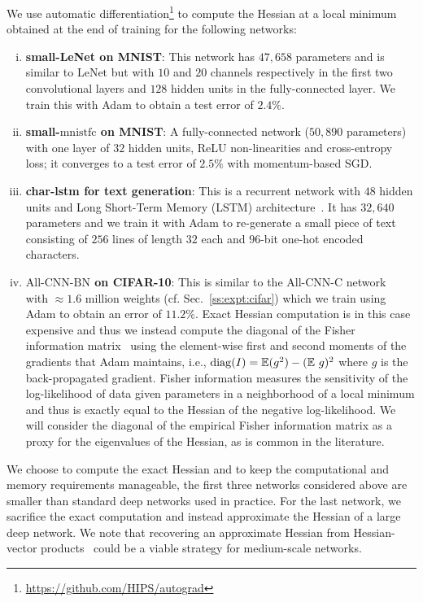 \documentclass[10pt]{article}
\newcommand{\mnistfc}{\textrm{mnistfc}}
\newcommand{\lenet}{\textrm{LeNet}}
\newcommand{\allcnn}{\textrm{All-CNN-BN}}
\begin{document}
We use automatic differentiation\footnote{\href{https://github.com/HIPS/autograd}{https://github.com/HIPS/autograd}} to compute the Hessian at a local minimum obtained at the end of training for the following networks:

\begin{enumerate}[(i)]
\item \textbf{small-LeNet on MNIST}: This network has $47,658$ parameters and is similar to $\lenet$ but with $10$ and $20$ channels respectively in the first two convolutional layers and $128$ hidden units in the fully-connected layer. We train this with Adam to obtain a test error of $2.4\%$.
%
\item \textbf{small-$\mnistfc$ on MNIST}: A fully-connected network ($50,890$ parameters) with one layer of $32$ hidden units, ReLU non-linearities and cross-entropy loss; it converges to a test error of $2.5\%$ with momentum-based SGD.
%
\item \textbf{char-lstm for text generation}: This is a recurrent network with $48$ hidden units and Long Short-Term Memory (LSTM) architecture~\citep{hochreiter1997long}. It has $32,640$ parameters and we train it with Adam to re-generate a small piece of text consisting of $256$ lines of length $32$ each and $96$-bit one-hot encoded characters.
%
\item \textbf{$\allcnn$ on CIFAR-10}: This is similar to the All-CNN-C network~\citep{springenberg2014striving} with $\approx 1.6$ million weights (cf. Sec.~\ref{ss:expt:cifar}) which we train using Adam to obtain an error of $11.2\%$. Exact Hessian computation is in this case expensive and thus we instead compute the diagonal of the Fisher information matrix~\citep{wasserman2013all} using the element-wise first and second moments of the gradients that Adam maintains, i.e., $\mathrm{diag} (I) = \mathbb{E}(g^2) - (\mathbb{E}\ g)^2$ where $g$ is the back-propagated gradient. Fisher information measures the sensitivity of the log-likelihood of data given parameters in a neighborhood of a local minimum and thus is exactly equal to the Hessian of the negative log-likelihood. We will consider the diagonal of the empirical Fisher information matrix as a proxy for the eigenvalues of the Hessian, as is common in the literature.
\end{enumerate}

We choose to compute the exact Hessian and to keep the computational and memory requirements manageable, the first three networks considered above are smaller than standard deep networks used in practice. For the last network, we sacrifice the exact computation and instead approximate the Hessian of a large deep network. We note that recovering an approximate Hessian from Hessian-vector products~\citep{pearlmutter1994fast} could be a viable strategy for medium-scale networks.
\end{document}
